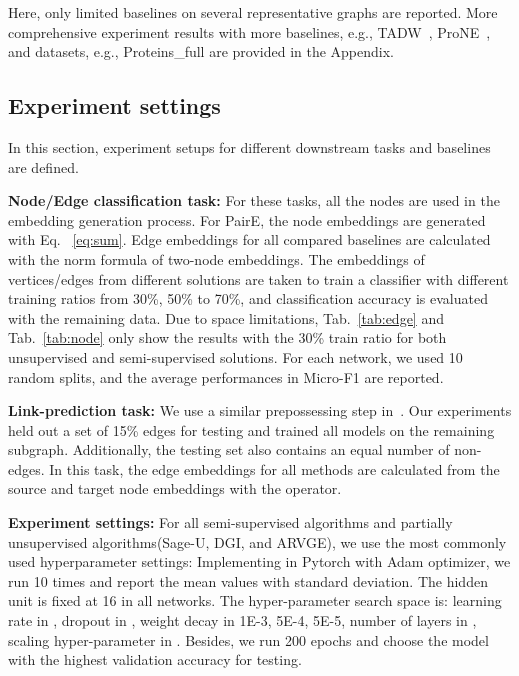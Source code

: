 \documentclass[10pt,journal,compsoc]{IEEEtran}
\begin{document}
Here, only limited baselines on several representative graphs are reported. More comprehensive experiment results with more baselines, e.g., TADW~\cite{yang2015TADM}, ProNE~\cite{Zhang19_prone}, and datasets, e.g., Proteins\_full are provided in the Appendix. 
 
\subsection{Experiment settings}

In this section, experiment setups for different downstream tasks and baselines are defined. 

\noindent\textbf{Node/Edge classification task:} For these tasks, all the nodes are used in the embedding generation process. For PairE, the node embeddings are generated with Eq. ~\ref{eq:sum}. Edge embeddings for all compared baselines are calculated with the  norm formula of two-node embeddings. The embeddings of vertices/edges from different solutions are taken to train a classifier with different training ratios from 30\%, 50\% to 70\%, and classification accuracy is evaluated with the remaining data. Due to space limitations, Tab.~\ref{tab:edge} and Tab.~\ref{tab:node} only show the results with the 30\% train ratio for both unsupervised and semi-supervised solutions. For each network, we used 10 random splits, and the average performances in Micro-F1 are reported. 


\noindent\textbf{Link-prediction task:} We use a similar prepossessing step in~\cite{Grover16}. Our experiments held out a set of 15\% edges for testing and trained all models on the remaining subgraph. Additionally, the testing set also contains an equal number of non-edges. In this task, the edge embeddings for all methods are calculated from the source and target node embeddings with the  operator. 

\noindent\textbf{Experiment settings:} For all semi-supervised algorithms and partially unsupervised algorithms(Sage-U, DGI, and ARVGE), we use the most commonly used hyperparameter settings: Implementing in Pytorch with Adam optimizer, we run 10 times and report the mean values with standard deviation. The hidden unit is fixed at 16 in all networks. The hyper-parameter search space is: learning rate in , dropout in , weight decay in {1E-3, 5E-4, 5E-5}, number of layers in , scaling hyper-parameter in . Besides, we run 200 epochs and choose the model with the highest validation accuracy for testing.
\end{document}
